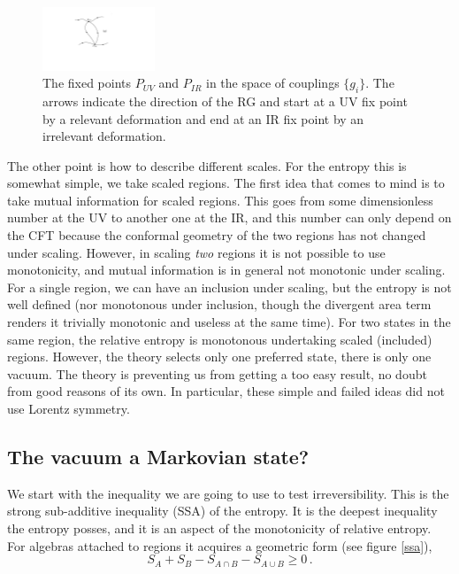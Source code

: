 \documentclass[12pt]{article}
\numberwithin{equation}{section}
\newcommand{\be}{\begin{equation}}
\newcommand{\ee}{\end{equation}}
\begin{document}
\begin{figure}[t]
\begin{center}  
\includegraphics[width=0.3\textwidth]{rg.pdf}
\captionsetup{width=0.9\textwidth}
\caption{The fixed points $P_{UV}$ and $P_{IR}$ in the space of couplings $\{g_i\}$. The arrows indicate the direction of the RG and start at a UV fix point by a relevant deformation and end at an IR fix point by an irrelevant deformation.}
\label{rg}
\end{center}  
\end{figure}

The other point is how to describe different scales. For the entropy this is somewhat simple, we take scaled regions. The first idea that comes to mind is to take mutual information for scaled regions. This goes from some dimensionless number at the UV to another one at the IR, and this number can only depend on the CFT because the conformal geometry of the two regions has not changed under scaling. However, in scaling {\sl two} regions it is not possible to use monotonicity, and mutual information is in general not monotonic under scaling. For a single region, we can have an inclusion under scaling, but the entropy is not well defined (nor monotonous under inclusion, though the divergent area term renders it trivially monotonic and useless at the same time). For two states in the same region, the relative entropy is monotonous undertaking scaled (included) regions. However, the theory selects only one preferred state, there is only one vacuum. The theory is preventing us from getting a too easy result, no doubt from good reasons of its own. In particular, these simple and failed ideas did not use Lorentz symmetry.     

\subsection{The vacuum a Markovian state?}
We start with the inequality we are going to use to test irreversibility. This is the strong sub-additive inequality (SSA) of the entropy. It is the deepest inequality the entropy posses, and it is an aspect of the monotonicity of relative entropy. For algebras attached to regions it acquires a geometric form (see figure \ref{ssa}),
\be\label{markov0}
S_A+S_B-S_{A\cap B}-S_{A\cup B}\ge 0\,. 
\ee
\end{document}
